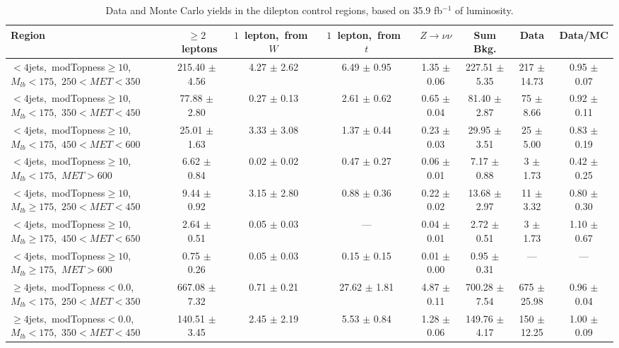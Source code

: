\begin{table}
\centering
{\scriptsize
\caption{Data and Monte Carlo yields in the dilepton control regions,
  based on 35.9 fb$^{-1}$ of luminosity.}
\label{tab:stop:lostlep:cryields}
\begin{tabular}{|l|c c c c c|c|c|}
\hline
Region  & $\ge2$~leptons & $1$~lepton,~from~$W$ & $1$~lepton,~from~$t$ & $Z\rightarrow\nu\nu$ & Sum Bkg. & Data & Data/MC \\*
\hline \hline
$<4$jets,~modTopness$\ge10$,~$M_{lb}<175$,~$250<MET<350$  & 215.40 $\pm$ 4.56  & 4.27 $\pm$ 2.62  & 6.49 $\pm$ 0.95  & 1.35 $\pm$ 0.06  & 227.51 $\pm$ 5.35  & 217 $\pm$ 14.73  & 0.95 $\pm$ 0.07 \\*
$<4$jets,~modTopness$\ge10$,~$M_{lb}<175$,~$350<MET<450$  & 77.88 $\pm$ 2.80  & 0.27 $\pm$ 0.13  & 2.61 $\pm$ 0.62  & 0.65 $\pm$ 0.04  & 81.40 $\pm$ 2.87  & 75 $\pm$ 8.66  & 0.92 $\pm$ 0.11 \\*
$<4$jets,~modTopness$\ge10$,~$M_{lb}<175$,~$450<MET<600$  & 25.01 $\pm$ 1.63  & 3.33 $\pm$ 3.08  & 1.37 $\pm$ 0.44  & 0.23 $\pm$ 0.03  & 29.95 $\pm$ 3.51  & 25 $\pm$ 5.00  & 0.83 $\pm$ 0.19 \\*
$<4$jets,~modTopness$\ge10$,~$M_{lb}<175$,~$MET>600$  & 6.62 $\pm$ 0.84  & 0.02 $\pm$ 0.02  & 0.47 $\pm$ 0.27  & 0.06 $\pm$ 0.01  & 7.17 $\pm$ 0.88  & 3 $\pm$ 1.73  & 0.42 $\pm$ 0.25 \\*
\hline
$<4$jets,~modTopness$\ge10$,~$M_{lb}\ge175$,~$250<MET<450$  & 9.44 $\pm$ 0.92  & 3.15 $\pm$ 2.80  & 0.88 $\pm$ 0.36  & 0.22 $\pm$ 0.02  & 13.68 $\pm$ 2.97  & 11 $\pm$ 3.32  & 0.80 $\pm$ 0.30 \\*
$<4$jets,~modTopness$\ge10$,~$M_{lb}\ge175$,~$450<MET<650$  & 2.64 $\pm$ 0.51  & 0.05 $\pm$ 0.03  & ---  & 0.04 $\pm$ 0.01  & 2.72 $\pm$ 0.51  & 3 $\pm$ 1.73  & 1.10 $\pm$ 0.67 \\*
$<4$jets,~modTopness$\ge10$,~$M_{lb}\ge175$,~$MET>600$  & 0.75 $\pm$ 0.26  & 0.05 $\pm$ 0.03  & 0.15 $\pm$ 0.15  & 0.01 $\pm$ 0.00  & 0.95 $\pm$ 0.31  & --- & --- \\*
\hline
$\ge4$jets,~modTopness$<0.0$,~$M_{lb}<175$,~$250<MET<350$  & 667.08 $\pm$ 7.32  & 0.71 $\pm$ 0.21  & 27.62 $\pm$ 1.81  & 4.87 $\pm$ 0.11  & 700.28 $\pm$ 7.54  & 675 $\pm$ 25.98  & 0.96 $\pm$ 0.04 \\*
$\ge4$jets,~modTopness$<0.0$,~$M_{lb}<175$,~$350<MET<450$  & 140.51 $\pm$ 3.45  & 2.45 $\pm$ 2.19  & 5.53 $\pm$ 0.84  & 1.28 $\pm$ 0.06  & 149.76 $\pm$ 4.17  & 150 $\pm$ 12.25  & 1.00 $\pm$ 0.09 \\*

\end{tabular}}
\end{table}
